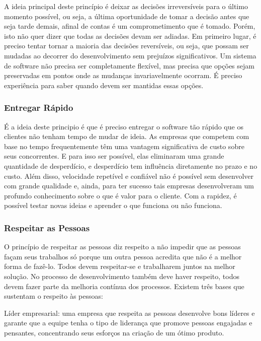 A ideia principal deste princípio é deixar as decisões irreversíveis para o último momento possível, ou seja, a última oportunidade de tomar a decisão antes que seja tarde demais, afinal de contas é um comprometimento que é tomado. Porém, isto não quer dizer que todas as decisões devam ser adiadas. Em primeiro lugar, é preciso tentar tornar a maioria das decisões reversíveis, ou seja, que possam ser mudadas ao decorrer do desenvolvimento sem prejuízos significativos. Um sistema de software não precisa ser completamente flexível, mas precisa que opções sejam preservadas em pontos onde as mudanças invariavelmente ocorram. É preciso experiência para saber quando devem ser mantidas essas opções.

\subsubsection[Entregar Rápido]{Entregar Rápido}

É a ideia deste principio é que é preciso entregar o software tão rápido que os clientes não tenham tempo de mudar de ideia.  As empresas que competem com base no tempo frequentemente têm uma vantagem significativa de custo sobre seus concorrentes. E para isso ser possível, elas eliminaram uma grande quantidade de desperdício, e desperdício tem influência diretamente no prazo e no custo. Além disso, velocidade repetível e confiável não é possível sem desenvolver com grande qualidade e, ainda, para ter sucesso tais empresas desenvolveram um profundo conhecimento sobre o que é valor para o cliente. Com a rapidez, é possível testar novas ideias e aprender o que funciona ou não funciona. 

\subsubsection[Respeitar as Pessoas]{Respeitar as Pessoas}

O princípio de respeitar as pessoas diz respeito a não impedir que as pessoas façam seus trabalhos só porque um outra pessoa acredita que não é a melhor forma de fazê-lo. Todos devem respeitar-se e trabalharem juntos na melhor solução. No processo de desenvolvimento também deve haver respeito, todos devem fazer parte da melhoria contínua dos processos. Existem três bases que sustentam o respeito às pessoas:

Líder empresarial: uma empresa que respeita as pessoas desenvolve bons líderes e garante que a equipe tenha o tipo de liderança que promove pessoas engajadas e pensantes, concentrando seus esforços na criação de um ótimo produto.

